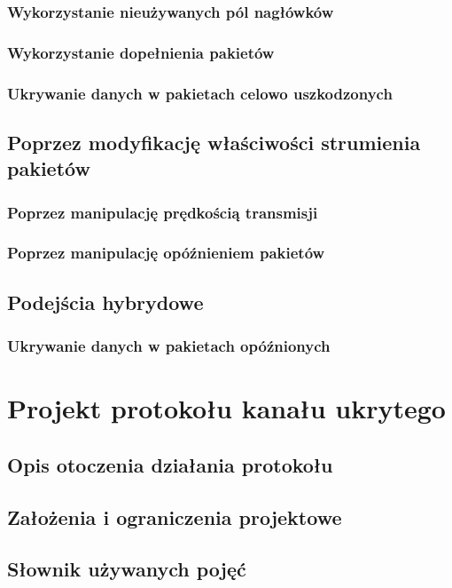 \documentclass[a4paper, twoside]{report}
\begin{document}
        \subsection{Wykorzystanie nieużywanych pól nagłówków}
        \subsection{Wykorzystanie dopełnienia pakietów}
        \subsection{Ukrywanie danych w pakietach celowo uszkodzonych}

    \section{Poprzez modyfikację właściwości strumienia pakietów}
        \subsection{Poprzez manipulację prędkością transmisji}
        \subsection{Poprzez manipulację opóźnieniem pakietów}

    \section{Podejścia hybrydowe}
        \subsection{Ukrywanie danych w pakietach opóźnionych}


\chapter{Projekt protokołu kanału ukrytego}
    \section{Opis otoczenia działania protokołu}
    \section{Założenia i ograniczenia projektowe}
    \section{Słownik używanych pojęć}
\end{document}
